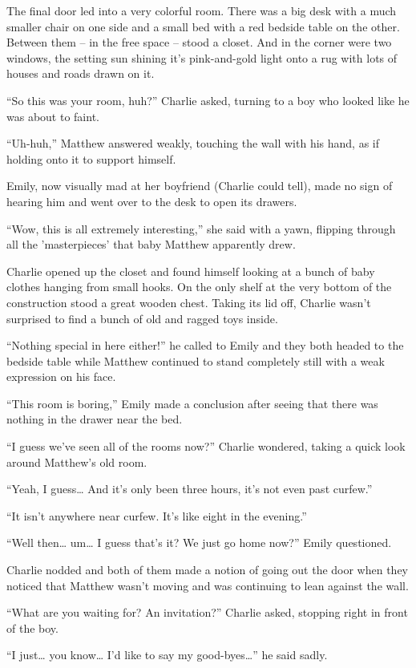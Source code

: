 The final door led into a very colorful room. There was a big desk with a much smaller chair on one side and a small bed with a red bedside table on the other. Between them – in the free space – stood a closet. And in the corner were two windows, the setting sun shining it's pink-and-gold light onto a rug with lots of houses and roads drawn on it.

“So this was your room, huh?” Charlie asked, turning to a boy who looked like he was about to faint.

“Uh-huh,” Matthew answered weakly, touching the wall with his hand, as if holding onto it to support himself.

Emily, now visually mad at her boyfriend (Charlie could tell), made no sign of hearing him and went over to the desk to open its drawers.

“Wow, this is all extremely interesting,” she said with a yawn, flipping through all the 'masterpieces' that baby Matthew apparently drew.

Charlie opened up the closet and found himself looking at a bunch of baby clothes hanging from small hooks. On the only shelf at the very bottom of the construction stood a great wooden chest. Taking its lid off, Charlie wasn't surprised to find a bunch of old and ragged toys inside.

“Nothing special in here either!” he called to Emily and they both headed to the bedside table while Matthew continued to stand completely still with a weak expression on his face.

“This room is boring,” Emily made a conclusion after seeing that there was nothing in the drawer near the bed.

“I guess we've seen all of the rooms now?” Charlie wondered, taking a quick look around Matthew's old room.

“Yeah, I guess… And it's only been three hours, it's not even past curfew.”

“It isn't anywhere near curfew. It's like eight in the evening.”

“Well then… um… I guess that's it? We just go home now?” Emily questioned.

Charlie nodded and both of them made a notion of going out the door when they noticed that Matthew wasn't moving and was continuing to lean against the wall.

“What are you waiting for? An invitation?” Charlie asked, stopping right in front of the boy.

“I just… you know… I'd like to say my good-byes…” he said sadly.

